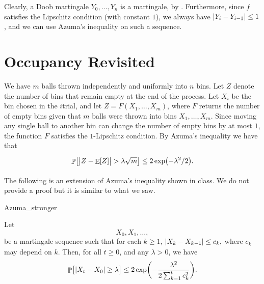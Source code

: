 Clearly, a Doob martingale $Y_0, \ldots, Y_n$ is a martingale, by
.  Furthermore, since $f$ satisfies the Lipschitz
condition (with constant $1$), we always have
$\left| {Y_i - Y_{i-1}} \right| \leq 1$, and we can use Azuma's inequality on
such a sequence.



\section{Occupancy Revisited}

We have $m$ balls thrown independently and uniformly into $n$ bins.  Let
$Z$ denote the number of bins that remain empty at the end of the
process.  Let $X_i$ be the bin chosen in the $i$\th trial, and let
$Z = F(X_1,\ldots, X_m)$, where $F$ returns the number of empty bins given
that $m$ balls were thrown into bins $X_1, \ldots,X_m$.  Since moving any
single ball to another bin can change the number of empty bins by at most
$1$, the function $F$ satisfies the $1$-Lipschitz condition.  By Azuma's
inequality we have that
\begin{equation*}
    \Bigl. \Prob{ \cardin{\bigl. Z - \Ex{Z} } > \lambda \sqrt{m}} \leq
    2\exp\pth{-\lambda^2/2}.
\end{equation*}


The following is an extension of Azuma's inequality shown in class. We
do not provide a proof but it is similar to what we saw.

\begin{fragment}{Azuma_stronger}
\begin{theorem}
    Let 
    \begin{equation*}
        X_0, X_1, \ldots,
    \end{equation*}
    be a martingale sequence such
    that for each $k \geq 1$,
    \begin{math}
        \bigl.  \left| {X_k - X_{k-1}} \right| \leq c_k,
    \end{math}
    where $c_k$ may depend on $k$. Then, for all $t \geq 0$, and any
    $\lambda>0$, we have
    \begin{equation*}
        \Prob{\bigl. \cardin{X_t - X_0} \geq \lambda }%
        \leq%
        2
        \exp\biggl( - \frac{\lambda^2}{2\sum_{k=1}^{t} c_k^2} \biggr).
    \end{equation*}
\end{theorem}
\end{fragment}

